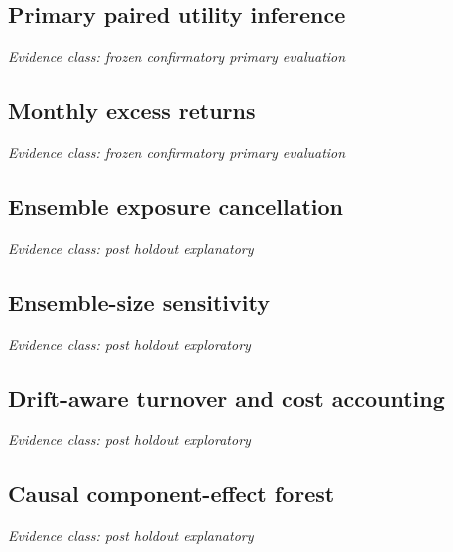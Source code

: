 \documentclass[11pt,a4paper]{article}
\begin{document}
\subsection*{Primary paired utility inference}
\noindent\textit{Evidence class: frozen confirmatory primary evaluation}\par\medskip
\begin{center}

\end{center}
\clearpage
\subsection*{Monthly excess returns}
\noindent\textit{Evidence class: frozen confirmatory primary evaluation}\par\medskip
\begin{center}

\end{center}
\clearpage
\subsection*{Ensemble exposure cancellation}
\noindent\textit{Evidence class: post holdout explanatory}\par\medskip
\begin{center}

\end{center}
\clearpage
\subsection*{Ensemble-size sensitivity}
\noindent\textit{Evidence class: post holdout exploratory}\par\medskip
\begin{center}

\end{center}
\clearpage
\subsection*{Drift-aware turnover and cost accounting}
\noindent\textit{Evidence class: post holdout exploratory}\par\medskip
\begin{center}

\end{center}
\clearpage
\subsection*{Causal component-effect forest}
\noindent\textit{Evidence class: post holdout explanatory}\par\medskip
\begin{center}

\end{center}
\clearpage
\end{document}
